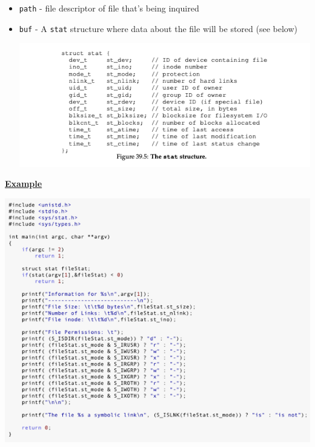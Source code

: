\documentclass[12pt]{article}
\begin{document}
\begin{enumerate}[1.]
\begin{enumerate}[a)]
\begin{itemize}
\begin{itemize}
\begin{itemize}
                    \begin{itemize}
                        \item \texttt{path} - file descriptor of file that's being inquired
                        \item \texttt{buf} - A \texttt{stat} structure where data about the file will be stored (see below)

                        \bigskip

                        \begin{center}
                        \includegraphics[width=\linewidth]{../images/midterm_4_solution_9.png}
                        \end{center}
                    \end{itemize}
                \end{itemize}

                \bigskip

                \underline{\textbf{Example}}

                \begin{center}
                \includegraphics[width=\linewidth]{../images/midterm_4_solution_10.png}
                \end{center}


\end{itemize}
\end{itemize}
\end{enumerate}
\end{enumerate}
\end{document}
